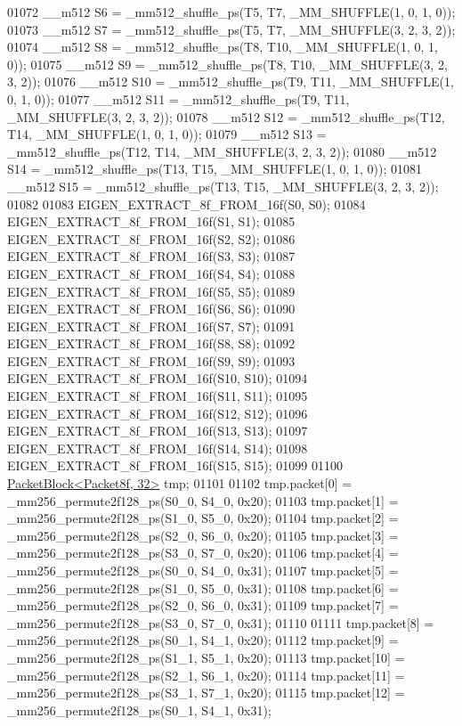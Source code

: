 \begin{DoxyCode}
01072   \_\_m512 S6 = \_mm512\_shuffle\_ps(T5, T7, \_MM\_SHUFFLE(1, 0, 1, 0));
01073   \_\_m512 S7 = \_mm512\_shuffle\_ps(T5, T7, \_MM\_SHUFFLE(3, 2, 3, 2));
01074   \_\_m512 S8 = \_mm512\_shuffle\_ps(T8, T10, \_MM\_SHUFFLE(1, 0, 1, 0));
01075   \_\_m512 S9 = \_mm512\_shuffle\_ps(T8, T10, \_MM\_SHUFFLE(3, 2, 3, 2));
01076   \_\_m512 S10 = \_mm512\_shuffle\_ps(T9, T11, \_MM\_SHUFFLE(1, 0, 1, 0));
01077   \_\_m512 S11 = \_mm512\_shuffle\_ps(T9, T11, \_MM\_SHUFFLE(3, 2, 3, 2));
01078   \_\_m512 S12 = \_mm512\_shuffle\_ps(T12, T14, \_MM\_SHUFFLE(1, 0, 1, 0));
01079   \_\_m512 S13 = \_mm512\_shuffle\_ps(T12, T14, \_MM\_SHUFFLE(3, 2, 3, 2));
01080   \_\_m512 S14 = \_mm512\_shuffle\_ps(T13, T15, \_MM\_SHUFFLE(1, 0, 1, 0));
01081   \_\_m512 S15 = \_mm512\_shuffle\_ps(T13, T15, \_MM\_SHUFFLE(3, 2, 3, 2));
01082 
01083   EIGEN\_EXTRACT\_8f\_FROM\_16f(S0, S0);
01084   EIGEN\_EXTRACT\_8f\_FROM\_16f(S1, S1);
01085   EIGEN\_EXTRACT\_8f\_FROM\_16f(S2, S2);
01086   EIGEN\_EXTRACT\_8f\_FROM\_16f(S3, S3);
01087   EIGEN\_EXTRACT\_8f\_FROM\_16f(S4, S4);
01088   EIGEN\_EXTRACT\_8f\_FROM\_16f(S5, S5);
01089   EIGEN\_EXTRACT\_8f\_FROM\_16f(S6, S6);
01090   EIGEN\_EXTRACT\_8f\_FROM\_16f(S7, S7);
01091   EIGEN\_EXTRACT\_8f\_FROM\_16f(S8, S8);
01092   EIGEN\_EXTRACT\_8f\_FROM\_16f(S9, S9);
01093   EIGEN\_EXTRACT\_8f\_FROM\_16f(S10, S10);
01094   EIGEN\_EXTRACT\_8f\_FROM\_16f(S11, S11);
01095   EIGEN\_EXTRACT\_8f\_FROM\_16f(S12, S12);
01096   EIGEN\_EXTRACT\_8f\_FROM\_16f(S13, S13);
01097   EIGEN\_EXTRACT\_8f\_FROM\_16f(S14, S14);
01098   EIGEN\_EXTRACT\_8f\_FROM\_16f(S15, S15);
01099 
01100   \hyperlink{struct_eigen_1_1internal_1_1_packet_block}{PacketBlock<Packet8f, 32>} tmp;
01101 
01102   tmp.packet[0] = \_mm256\_permute2f128\_ps(S0\_0, S4\_0, 0x20);
01103   tmp.packet[1] = \_mm256\_permute2f128\_ps(S1\_0, S5\_0, 0x20);
01104   tmp.packet[2] = \_mm256\_permute2f128\_ps(S2\_0, S6\_0, 0x20);
01105   tmp.packet[3] = \_mm256\_permute2f128\_ps(S3\_0, S7\_0, 0x20);
01106   tmp.packet[4] = \_mm256\_permute2f128\_ps(S0\_0, S4\_0, 0x31);
01107   tmp.packet[5] = \_mm256\_permute2f128\_ps(S1\_0, S5\_0, 0x31);
01108   tmp.packet[6] = \_mm256\_permute2f128\_ps(S2\_0, S6\_0, 0x31);
01109   tmp.packet[7] = \_mm256\_permute2f128\_ps(S3\_0, S7\_0, 0x31);
01110 
01111   tmp.packet[8] = \_mm256\_permute2f128\_ps(S0\_1, S4\_1, 0x20);
01112   tmp.packet[9] = \_mm256\_permute2f128\_ps(S1\_1, S5\_1, 0x20);
01113   tmp.packet[10] = \_mm256\_permute2f128\_ps(S2\_1, S6\_1, 0x20);
01114   tmp.packet[11] = \_mm256\_permute2f128\_ps(S3\_1, S7\_1, 0x20);
01115   tmp.packet[12] = \_mm256\_permute2f128\_ps(S0\_1, S4\_1, 0x31);

\end{DoxyCode}
